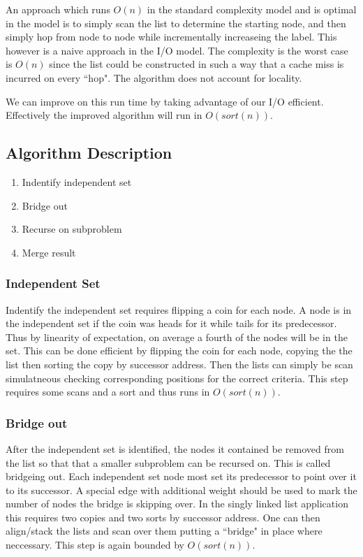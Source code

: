 \documentclass[11pt]{article}
\begin{document}
An approach which runs $O(n)$ in the standard complexity model and is optimal in the model is to simply scan the list to determine the 
starting node, and then simply hop from node to node while incrementally increaseing the label.  This however is a naive approach in 
the I/O model.  The complexity is the worst case is $O(n)$ since the list could be constructed in such a way that a cache miss is incurred on 
every ``hop".  The algorithm does not account for locality.  

We can improve on this run time by taking advantage of our I/O efficient.  Effectively the improved algorithm will run in $O(sort(n))$. 

\subsection{Algorithm Description}


\begin{enumerate}
  \item Indentify independent set
  \item Bridge out
  \item Recurse on subproblem
  \item Merge result
\end{enumerate}

\subsubsection{Independent Set}
Indentify the independent set requires flipping a coin for each node.  A node is in the independent set if the coin was heads for 
it while tails for its predecessor. Thus by linearity of expectation, on average a fourth of the nodes will be in the set. 
This can be done efficient by flipping the coin for each node, copying the the list then sorting the copy 
by successor address. Then the lists can simply be scan simulatneous checking corresponding positions for the correct criteria.  This step 
requires some scans and a sort and thus runs in $O(sort(n))$. 

\subsubsection{Bridge out}
After the independent set is identified, the nodes it contained be removed from the list so that that a smaller subproblem can be recursed on.
This is called bridgeing out.  Each independent set node most set its predecessor to point over it to its successor. A special edge 
with additional weight should be used to mark the number of nodes the bridge is skipping over.  In the singly linked list application this 
requires two copies and two sorts by successor address.  One can then align/stack the lists and scan over them putting a ``bridge" in place 
where neccessary.  This step is again bounded by $O(sort(n))$.
\end{document}
